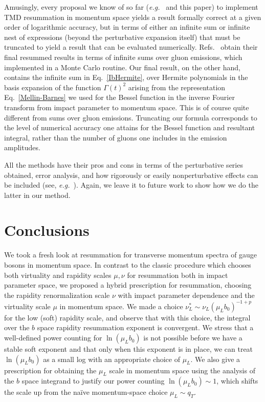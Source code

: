 \documentclass[a4,letterpaper,11pt]{article}
\newcommand{\eg}{\emph{e.g.}~}
\newcommand{\eq}[1]{Eq.~\eqref{#1}}
\begin{document}
Amusingly, every proposal we know of so far  (\eg \cite{Ebert:2016gcn,Monni:2016ktx,Bizon:2017rah} and this paper) to implement TMD resummation in momentum space yields a result formally correct at a given order of logarithmic accuracy, but in terms of either an infinite sum or infinite nest of expressions (beyond the perturbative expansion itself) that must be truncated to yield a result that can be evaluated numerically. Refs.~\cite{Ebert:2016gcn,Monni:2016ktx,Bizon:2017rah} obtain their final resummed results in terms of infinite sums over gluon emissions, which \cite{Monni:2016ktx,Bizon:2017rah} implemented in a Monte Carlo routine. Our final result, on the other hand, contains the infinite sum in \eq{IbHermite}, over Hermite polynomials in the basis expansion of the function $\Gamma(t)^2$ arising from the representation \eq{Mellin-Barnes} we used for the Bessel function in the inverse Fourier transform from impact parameter to momentum space. This is of course quite different from sums over gluon emissions. Truncating our formula corresponds to the level of numerical accuracy one attains for the Bessel function and resultant integral, rather than the number of gluons one includes in the emission amplitudes.

All the methods have their pros and cons in terms of the perturbative series obtained, error analysis, and how rigorously or easily nonperturbative effects can be included (see, \eg \cite{Collins:2014jpa}). Again, we leave it to future work to show how we do the latter in our method.


\section{Conclusions}
\label{sec:conclusions}
We took a fresh look at resummation for transverse momentum spectra of gauge bosons in momentum space. In contrast to the classic procedure which chooses both virtuality and rapidity scales $\mu,\nu$ for resummation both in impact parameter space, we proposed a hybrid prescription for resummation, choosing the rapidity renormalization scale $\nu$ with impact parameter dependence and the virtuality scale $\mu$ in momentum space.  We made a choice $\nu_L^* \sim \nu_L(\mu_L b_0)^{-1+p}$ for the low (soft) rapidity scale, and observe that with this choice, the integral over the $b$ space rapidity resummation exponent is convergent. We stress that a well-defined power counting for $\ln(\mu_Lb_0)$ is not possible before we have a stable soft exponent and that only when this exponent is in place, we can treat $\ln(\mu_L b_0) $ as a small log with an appropriate choice of $\mu_L$. We also give a prescription for obtaining the $\mu_L$ scale in momentum space using the analysis of the $b$ space integrand to justify our power counting $\ln(\mu_L b_0) \sim 1 $, which shifts the scale up  from the na\"{i}ve momentum-space choice $\mu_L\sim q_T$.
\end{document}
